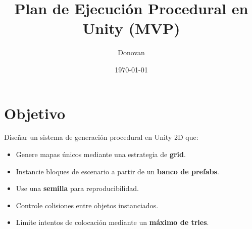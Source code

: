 \documentclass[a4paper,12pt]{article}
\title{Plan de Ejecución Procedural en Unity (MVP)}
\author{Donovan}
\date{\today}
\begin{document}
\maketitle

\section{Objetivo}
Diseñar un sistema de generación procedural en Unity 2D que:
\begin{itemize}
    \item Genere mapas únicos mediante una estrategia de \textbf{grid}.
    \item Instancie bloques de escenario a partir de un \textbf{banco de prefabs}.
    \item Use una \textbf{semilla} para reproducibilidad.
    \item Controle colisiones entre objetos instanciados.
    \item Limite intentos de colocación mediante un \textbf{máximo de tries}.
\end{itemize}
\end{document}
